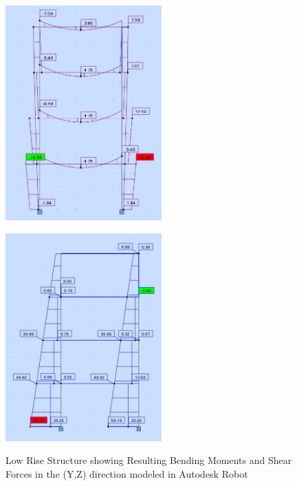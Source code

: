\documentclass[11pt,a4paper,titlepage]{report}
\begin{document}
\begin{figure}
\begin{minipage}{0.49\textwidth}
   \centering
    \includegraphics[width=6cm]{Nat_My_Y.JPG}
\end{minipage}
\begin{minipage}{0.49\textwidth}
   \centering
    \includegraphics[width=6cm]{Nat_Fx_Y.JPG}
        \label{fig:I.4: Autodesk Forces 2}
\end{minipage}
  \caption{Low Rise Structure showing Resulting Bending Moments and Shear Forces in the (Y,Z) direction  modeled in Autodesk Robot}
\end{figure}
\end{document}
